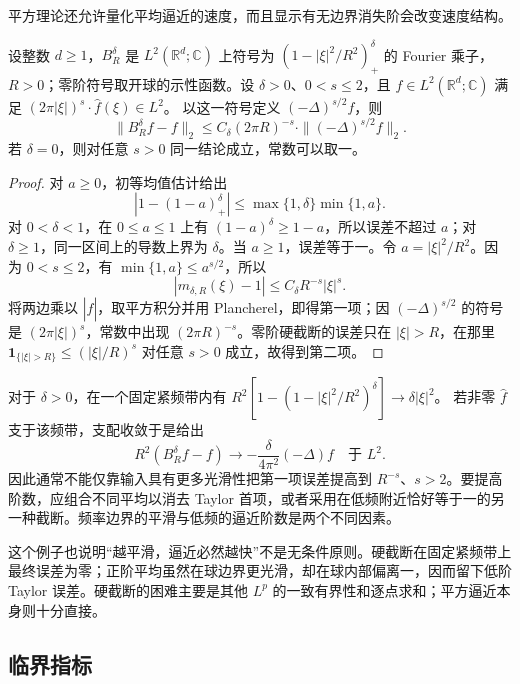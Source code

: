 \ProseParagraphBreak
平方理论还允许量化平均逼近的速度，而且显示有无边界消失阶会改变速度结构。
\begin{proposition}\label{b2:prop:24-l2-rate}
设整数 \(d\geq1\)，\(B_R^\delta\) 是 \(L^2(\mathbb R^d;\mathbb C)\) 上符号为 \((1-|\xi|^2/R^2)_+^\delta\) 的 Fourier 乘子，\(R>0\)；零阶符号取开球的示性函数。设 \(\delta>0\)、\(0<s\leq2\)，且
\(f\in L^2(\mathbb R^d;\mathbb C)\) 满足
\((2\pi|\xi|)^s\cdot\widehat f(\xi)\in L^2\)。
以这一符号定义 \((-\Delta)^{s/2}f\)，则
\[
 \|B_R^\delta f-f\|_2
 \leq C_\delta(2\pi R)^{-s}\cdot\|(-\Delta)^{s/2}f\|_2.
\]
若 \(\delta=0\)，则对任意 \(s>0\) 同一结论成立，常数可以取一。
\end{proposition}
\begin{proof}
对 \(a\geq0\)，初等均值估计给出
\[
 |1-(1-a)_+^\delta|\leq\max\{1,\delta\}\min\{1,a\}.
\]
对 \(0<\delta<1\)，在 \(0\leq a\leq1\) 上有
\((1-a)^\delta\geq1-a\)，所以误差不超过 \(a\)；对 \(\delta\geq1\)，同一区间上的导数上界为 \(\delta\)。当 \(a\geq1\)，误差等于一。令 \(a=|\xi|^2/R^2\)。因为 \(0<s\leq2\)，有
\(\min\{1,a\}\leq a^{s/2}\)，所以
\[
 |m_{\delta,R}(\xi)-1|
 \leq C_\delta R^{-s}|\xi|^s.
\]
将两边乘以 \(|\widehat f|\)，取平方积分并用 Plancherel，即得第一项；因 \((-\Delta)^{s/2}\) 的符号是 \((2\pi|\xi|)^s\)，常数中出现 \((2\pi R)^{-s}\)。零阶硬截断的误差只在 \(|\xi|>R\)，在那里
\(\mathbf1_{\{|\xi|>R\}}\leq(|\xi|/R)^s\)
对任意 \(s>0\) 成立，故得到第二项。
\end{proof}
对于 \(\delta>0\)，在一个固定紧频带内有
\(R^2[1-(1-|\xi|^2/R^2)^\delta]\to\delta|\xi|^2\)。
若非零 \(\widehat f\) 支于该频带，支配收敛于是给出
\[
 R^2(B_R^\delta f-f)\longrightarrow
 -\frac{\delta}{4\pi^2}(-\Delta)f
 \quad\text{于 }L^2.
\]
因此通常不能仅靠输入具有更多光滑性把第一项误差提高到 \(R^{-s}\)、\(s>2\)。要提高阶数，应组合不同平均以消去 Taylor 首项，或者采用在低频附近恰好等于一的另一种截断。频率边界的平滑与低频的逼近阶数是两个不同因素。

\ProseParagraphBreak

这个例子也说明“越平滑，逼近必然越快”不是无条件原则。硬截断在固定紧频带上最终误差为零；正阶平均虽然在球边界更光滑，却在球内部偏离一，因而留下低阶 Taylor 误差。硬截断的困难主要是其他 \(L^p\) 的一致有界性和逐点求和；平方逼近本身则十分直接。

\subsection{临界指标}
\label{b2:subsec:240302}

